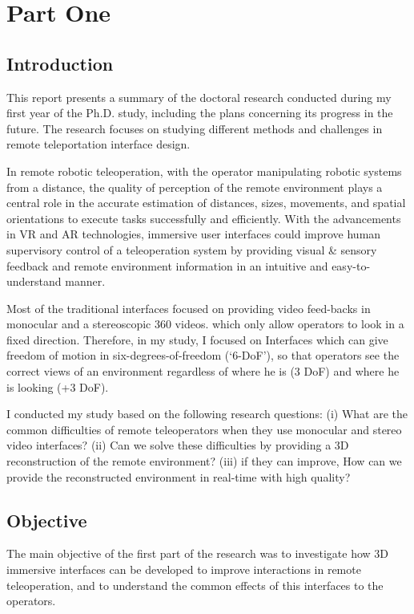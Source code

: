 \chapter{Part One}
\section{Introduction}
This report presents a summary of the doctoral research conducted during my first year of the Ph.D. study, including the plans concerning its progress in the future. The research focuses on studying different methods and challenges in remote teleportation interface design.

In remote robotic teleoperation, with the operator manipulating robotic systems from a distance, the quality of perception of the remote environment plays a central role in the accurate estimation of distances, sizes, movements, and spatial orientations to execute tasks successfully and efficiently. With the advancements in VR and AR technologies, immersive user interfaces could improve human supervisory control of a teleoperation system by providing visual & sensory feedback and remote environment information in an intuitive and easy-to-understand manner.

Most of the traditional interfaces focused on providing video feed-backs in monocular and a stereoscopic 360 videos. which only allow operators to look in a fixed direction. Therefore, in my study, I focused on Interfaces which can give freedom of motion in six-degrees-of-freedom (‘6-DoF’), so that operators see the correct views of an environment regardless of where he is (3 DoF) and where he is looking (+3 DoF).

I conducted my study based on the following research questions: (i) What are the common difficulties of remote teleoperators when they use monocular and stereo video interfaces? (ii) Can we solve these difficulties by providing a 3D reconstruction of the remote environment? (iii) if they can improve, How can we provide the reconstructed environment in real-time with high quality?


\section{Objective}

The main objective of the first part of the research was to investigate how 3D immersive interfaces can be developed to improve interactions in remote teleoperation, and to understand the common effects of this interfaces to the operators.


